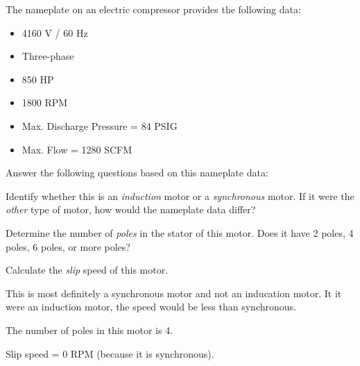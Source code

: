 

The nameplate on an electric compressor provides the following data:

\begin{itemize}
\item{} 4160 V / 60 Hz
\item{} Three-phase
\item{} 850 HP
\item{} 1800 RPM
\item{} Max. Discharge Pressure = 84 PSIG
\item{} Max. Flow = 1280 SCFM
\end{itemize}

\vskip 10pt

\noindent
Answer the following questions based on this nameplate data:

\vskip 10pt

Identify whether this is an {\it induction} motor or a {\it synchronous} motor.  If it were the {\it other} type of motor, how would the nameplate data differ?

\vskip 10pt

Determine the number of {\it poles} in the stator of this motor.  Does it have 2 poles, 4 poles, 6 poles, or more poles?

\vskip 10pt

Calculate the {\it slip} speed of this motor.

\vskip 10pt







This is most definitely a synchronous motor and not an inducation motor.  It it were an induction motor, the speed would be less than synchronous.
 
\vskip 10pt

The number of poles in this motor is 4.

\vskip 10pt

Slip speed = 0 RPM (because it is synchronous).







